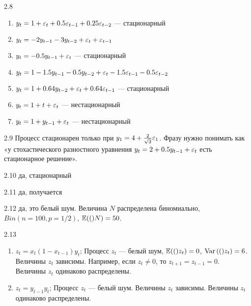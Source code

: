 \protect \hypertarget {soln:2.8}{}
\begin{solution}{{2.8}}

\begin{enumerate}
\item $y_t=1+\varepsilon_t+0.5\varepsilon_{t-1}+0.25\varepsilon_{t-2}$ — стационарный
\item $y_t=-2y_{t-1}-3y_{t-2}+\varepsilon_t+\varepsilon_{t-1}$
\item $y_t=-0.5y_{t-1} + \varepsilon_t$ — стационарный
\item $y_t=1-1.5 y_{t-1} - 0.5 y_{t-2} + \varepsilon_t - 1.5\varepsilon_{t-1} - 0.5\varepsilon_{t-2}$
\item $y_t=1+0.64y_{t-2}+\varepsilon_t+0.64\varepsilon_{t-1}$ — стационарный
\item $y_t=1+t+\varepsilon_t$ — нестационарный
\item $y_t=1+y_{t-1}+\varepsilon_t$ — нестационарный
\end{enumerate}
\end{solution}
\protect \hypertarget {soln:2.9}{}
\begin{solution}{{2.9}}
Процесс стационарен только при $y_1=4+\frac{2}{\sqrt{3}}\varepsilon_1$. Фразу нужно понимать как «у стохастического разностного уравнения $y_t=2+0.5y_{t-1}+\varepsilon_t$ есть стационарное решение».
\end{solution}
\protect \hypertarget {soln:2.10}{}
\begin{solution}{{2.10}}
да, стационарный
\end{solution}
\protect \hypertarget {soln:2.11}{}
\begin{solution}{{2.11}}
да, получается
\end{solution}
\protect \hypertarget {soln:2.12}{}
\begin{solution}{{2.12}}
да, это белый шум. Величина $N$ распределена биномиально, $Bin(n=100,p=1/2)$, $\mathbb{E}{\left((\right)}N)=50$.
\end{solution}
\protect \hypertarget {soln:2.13}{}
\begin{solution}{{2.13}}

\begin{enumerate}
  \item $z_t = x_t (1-x_{t-1})y_t$;
    Процесс $z_t$ — белый шум, $\mathbb{E}{\left((\right)}z_t)=0$, $\operatorname{Var}{\left((\right)}z_t)=6$. Величины $z_t$ зависимы. Например, если $z_t \neq 0$, то $z_{t+1}=z_{t-1}=0$. Величины $z_t$ одинаково распределены.
\item $z_t = y_{t-1}y_t$;
Процесс $z_t$ — белый шум. Величины $z_t$ зависимы. Величины $z_t$ одинаково распределены.
\end{enumerate}


\end{solution}
